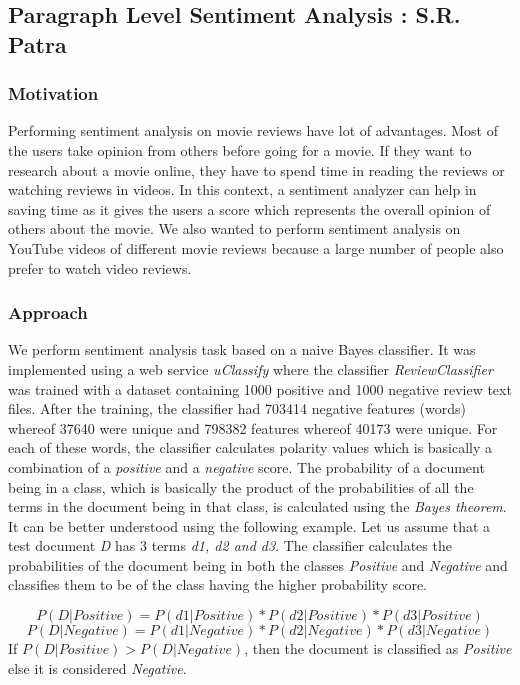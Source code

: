 \subsection{Paragraph Level Sentiment Analysis : S.R. Patra}
\subsubsection{Motivation}
Performing sentiment analysis on movie reviews have  lot of advantages. Most of the users take opinion from others before going for a movie. If they want to research about a movie online, they have to spend time in reading the reviews or watching reviews in videos. In this context, a sentiment analyzer can help in saving time as it gives the users a score which represents the overall opinion of others about the movie. We also wanted to perform sentiment analysis on YouTube videos of different movie reviews because a large number of people also prefer to watch video reviews. 

\subsubsection{Approach}

We perform sentiment analysis task based on a naive Bayes classifier. It was implemented using a web service \textit{uClassify}\cite{uclassify} where the classifier \textit{ReviewClassifier} was trained with a dataset containing 1000 positive and 1000 negative review text files\cite{Dataset}. After the training, the classifier had 703414 negative features (words) whereof 37640 were unique and 798382 features whereof 40173 were unique. For each of these words, the classifier calculates polarity values which is basically a combination of a \textit{positive} and a \textit{negative} score.  The probability of a document being in a class, which is basically the product of the probabilities of all the terms in the document being in that class, is calculated using the \textit{Bayes theorem}. It can be better understood using the following example. Let us assume that a test document \textit{D} has 3 terms \textit{d1, d2 and d3}. The classifier calculates the probabilities of the document being in both the classes \textit{Positive} and \textit{Negative} and classifies them to be of the class having the higher probability score.

$$ P(D|Positive) = P(d1|Positive) * P(d2|Positive)* P(d3|Positive)$$
$$P(D|Negative) = P(d1|Negative) * P(d2|Negative)* P(d3|Negative)$$
\linebreak
If $P(D|Positive) > P(D|Negative)$, then the document is classified as \textit{Positive} else it is considered \textit{Negative}. 

